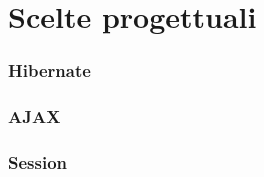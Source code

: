 \documentclass[a4paper,10pt]{article}
\begin{document}
\part{Scelte progettuali}

\section{Hibernate}
\section{AJAX}
\section{Session}
\end{document}
